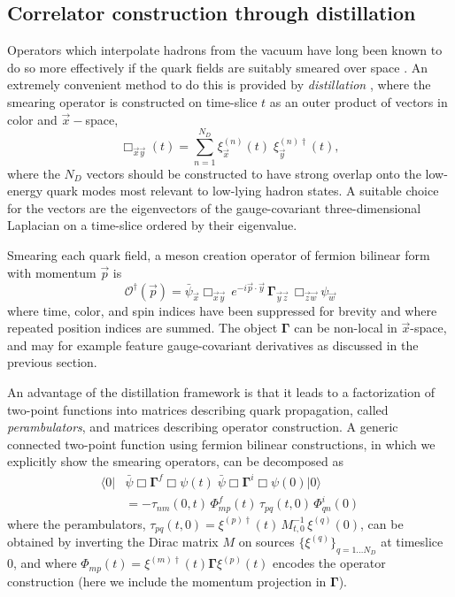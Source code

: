 \documentclass[twocolumn,amsmath,amssymb,prd,10pt,floatfix, 
superscriptaddress,nofootinbib, showpacs, preprintnumbers]{revtex4-1}
\begin{document}
\subsection{Correlator construction through distillation \label{ssec::two_points_corr_const}}

Operators which interpolate hadrons from the vacuum have long been known to do so more effectively if the quark fields are suitably smeared over space \cite{Gusken:1989ad, Allton:1993wc}. An extremely convenient method to do this is provided by \emph{distillation} \cite{Peardon:2009gh}, where the smearing operator is constructed on time-slice $t$ as an outer product of vectors in color and $\vec{x}-$space,
\begin{equation}
\Box_{\vec{x}\vec{y}}(t) = \sum_{n=1}^{N_D} \xi^{(n)}_{\vec{x}}(t)\; \xi^{(n)\dag}_{\vec{y}}(t), \label{distillation}
\end{equation}
where the $N_D$ vectors should be constructed to have strong overlap onto the low-energy quark modes most relevant to low-lying hadron states. A suitable choice for the vectors are the eigenvectors of the gauge-covariant three-dimensional Laplacian on a time-slice ordered by their eigenvalue.

Smearing each quark field, a meson creation operator of fermion bilinear form with momentum $\vec{p}$ is 
\begin{equation*}
\mathcal{O}^\dagger(\vec{p}) = \bar{\psi}_{\vec{x}} \Box_{\vec{x}\vec{y}}\,  e^{-i \vec{p} \cdot \vec{y}}\,
\mathbf{\Gamma}_{\vec{y}\vec{z}} \, \Box_{\vec{z}\vec{w}} \psi_{\vec{w}} 
\end{equation*}
where time, color, and spin indices have been suppressed for brevity and where repeated position indices are summed. The object $\mathbf{\Gamma}$ can be non-local in $\vec{x}$-space, and may for example feature gauge-covariant derivatives as discussed in the previous section.

An advantage of the distillation framework is that it leads to a factorization of two-point functions into matrices describing quark propagation, called \emph{perambulators}, and matrices describing operator construction. A generic connected two-point function using fermion bilinear constructions, in which we explicitly show the smearing operators, can be decomposed as 
\begin{align}
\big\langle 0 \big|& \bar{\psi} \Box \mathbf{\Gamma}^f \Box \psi (t) \; \bar{\psi} \Box \mathbf{\Gamma}^i \Box \psi (0) \big| 0 \big\rangle \nonumber \\
&= - \tau_{nm}(0,t)\, \Phi^f_{mp}(t)\, \tau_{pq}(t,0) \,\Phi^i_{qn}(0) \nonumber
\end{align}
where the perambulators, ${\tau_{pq}(t,0) = \xi^{(p)\dag}(t) \, M^{-1}_{t,0} \, \xi^{(q)}(0)}$, can be obtained by inverting the Dirac matrix $M$ on sources $\{ \xi^{(q)} \}_{q=1\ldots N_D}$ at timeslice 0, and where ${\Phi_{mp}(t)  = \xi^{(m)\dag}(t) \mathbf{\Gamma} \xi^{(p)}(t)}$ encodes the operator construction (here we include the momentum projection in $\mathbf{\Gamma}$).
\end{document}

